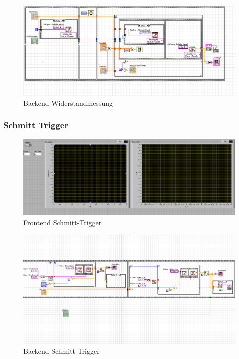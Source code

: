 \documentclass[12pt,twoside,a4paper]{scrartcl}
\begin{document}
				\begin{figure}[H]
					\centering
					\includegraphics[width =  \textwidth]{Pictures/Programme/Backend_Capacitor}
					\caption{Backend Widerstandmessung}
				\end{figure}

		\subsubsection{Schmitt Trigger}
			\label{Programme::Schmitt}
			\begin{figure}[H]
				\centering
				\includegraphics[width = \textwidth]{Pictures/Programme/Frontend_Schmitt}
				\caption{Frontend Schmitt-Trigger}
			\end{figure}

			\begin{figure}[H]
				\centering
				\includegraphics[width =  \textwidth]{Pictures/Programme/Backend_Schmitt}
				\caption{Backend Schmitt-Trigger}
			\end{figure}
\end{document}
